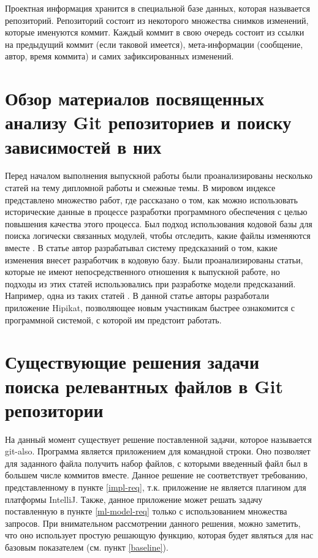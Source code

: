 Проектная информация хранится в специальной базе данных, которая называется репозиторий. Репозиторий состоит из некоторого множества снимков изменений, которые именуются коммит. Каждый коммит в свою очередь состоит из ссылки на предыдущий коммит (если таковой имеется), мета-информации (сообщение, автор, время коммита) и самих зафиксированных изменений. 
\section{Обзор материалов посвященных анализу Git репозиториев и поиску зависимостей в них}
Перед началом выполнения выпускной работы были проанализированы несколько статей на тему дипломной работы и смежные темы. В мировом индексе представлено множество работ, где рассказано о том, как можно использовать исторические данные в процессе разработки программного обеспечения с целью повышения качества этого процесса. Был подход использования кодовой базы для поиска логически связанных модулей, чтобы отследить, какие файлы изменяются вместе \cite{logical-modules}. В статье \cite{source-change} автор разрабатывал систему предсказаний о том, какие изменения внесет разработчик в кодовую базу. Были проанализированы статьи, которые не имеют непосредственного отношения к выпускной работе, но подходы из этих статей использовались при разработке модели предсказаний. Например, одна из таких статей \cite{project-memory}. В данной статье авторы разработали приложение Hipikat, позволяющее новым участникам быстрее ознакомится с программной системой, с которой им предстоит работать.
\section{Существующие решения задачи поиска релевантных файлов в Git репозитории}
На данный момент существует решение поставленной задачи, которое называется git-also. Программа является приложением для командной строки. Оно позволяет для заданного файла получить набор файлов, с которыми введенный файл был в большем числе коммитов вместе. Данное решение не соответствует требованию, представленному в пункте \ref{impl-req}, т.к. приложение не является плагином для платформы IntelliJ. Также, данное приложение может решать задачу поставленную в пункте \ref{ml-model-req} только с использованием множества запросов. При внимательном рассмотрении данного решения, можно заметить, что оно использует простую решающую функцию, которая будет являться для нас базовым показателем (см. пункт \ref{baseline}).
\chapterconclusion